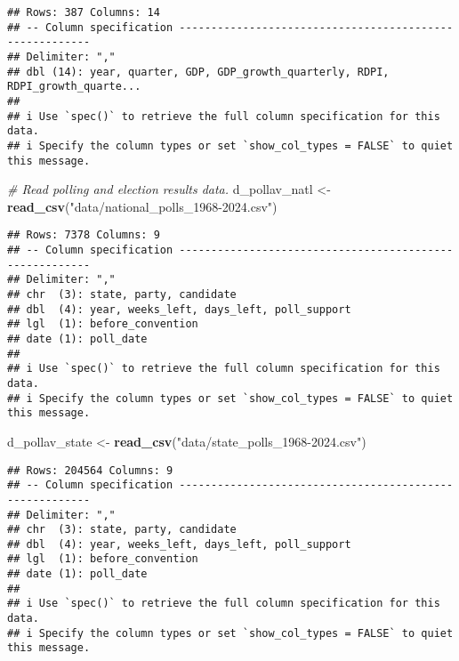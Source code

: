 \documentclass[
]{article}
\newenvironment{Shaded}{\begin{snugshade}}{\end{snugshade}}
\newcommand{\CommentTok}[1]{\textcolor[rgb]{0.56,0.35,0.01}{\textit{#1}}}
\newcommand{\FunctionTok}[1]{\textcolor[rgb]{0.13,0.29,0.53}{\textbf{#1}}}
\newcommand{\NormalTok}[1]{#1}
\newcommand{\OtherTok}[1]{\textcolor[rgb]{0.56,0.35,0.01}{#1}}
\newcommand{\StringTok}[1]{\textcolor[rgb]{0.31,0.60,0.02}{#1}}
\begin{document}
\begin{verbatim}
## Rows: 387 Columns: 14
## -- Column specification --------------------------------------------------------
## Delimiter: ","
## dbl (14): year, quarter, GDP, GDP_growth_quarterly, RDPI, RDPI_growth_quarte...
## 
## i Use `spec()` to retrieve the full column specification for this data.
## i Specify the column types or set `show_col_types = FALSE` to quiet this message.
\end{verbatim}

\begin{Shaded}
\begin{Highlighting}[]
\CommentTok{\# Read polling and election results data. }
\NormalTok{d\_pollav\_natl }\OtherTok{\textless{}{-}} \FunctionTok{read\_csv}\NormalTok{(}\StringTok{"data/national\_polls\_1968{-}2024.csv"}\NormalTok{)}
\end{Highlighting}
\end{Shaded}

\begin{verbatim}
## Rows: 7378 Columns: 9
## -- Column specification --------------------------------------------------------
## Delimiter: ","
## chr  (3): state, party, candidate
## dbl  (4): year, weeks_left, days_left, poll_support
## lgl  (1): before_convention
## date (1): poll_date
## 
## i Use `spec()` to retrieve the full column specification for this data.
## i Specify the column types or set `show_col_types = FALSE` to quiet this message.
\end{verbatim}

\begin{Shaded}
\begin{Highlighting}[]
\NormalTok{d\_pollav\_state }\OtherTok{\textless{}{-}} \FunctionTok{read\_csv}\NormalTok{(}\StringTok{"data/state\_polls\_1968{-}2024.csv"}\NormalTok{)}
\end{Highlighting}
\end{Shaded}

\begin{verbatim}
## Rows: 204564 Columns: 9
## -- Column specification --------------------------------------------------------
## Delimiter: ","
## chr  (3): state, party, candidate
## dbl  (4): year, weeks_left, days_left, poll_support
## lgl  (1): before_convention
## date (1): poll_date
## 
## i Use `spec()` to retrieve the full column specification for this data.
## i Specify the column types or set `show_col_types = FALSE` to quiet this message.
\end{verbatim}
\end{document}
